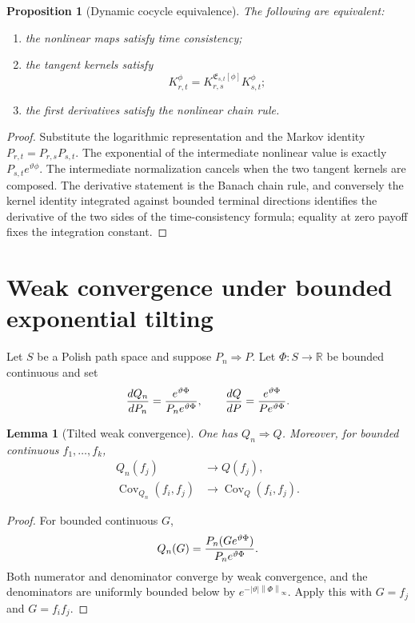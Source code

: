 \documentclass[11pt,reqno]{amsart}
\newtheorem{lemma}[theorem]{Lemma}
\newtheorem{proposition}[theorem]{Proposition}
\theoremstyle{definition}
\newcommand{\R}{\mathbb R}
\newcommand{\norm}[1]{\left\lVert#1\right\rVert}
\newcommand{\abs}[1]{\left\lvert#1\right\rvert}
\begin{document}
\begin{proposition}[Dynamic cocycle equivalence]\label{prop:cocycle-equivalence}
The following are equivalent:
\begin{enumerate}
\item the nonlinear maps satisfy time consistency;
\item the tangent kernels satisfy
\[
 K_{r,t}^{\phi}
 =K_{r,s}^{\mathfrak E_{s,t}[\phi]}K_{s,t}^{\phi};
\]
\item the first derivatives satisfy the nonlinear chain rule.
\end{enumerate}
\end{proposition}

\begin{proof}
Substitute the logarithmic representation and the Markov identity
$P_{r,t}=P_{r,s}P_{s,t}$.  The exponential of the intermediate nonlinear value
is exactly $P_{s,t}e^{\vartheta\phi}$.  The intermediate normalization cancels
when the two tangent kernels are composed.  The derivative statement is the
Banach chain rule, and conversely the kernel identity integrated against
bounded terminal directions identifies the derivative of the two sides of the
time-consistency formula; equality at zero payoff fixes the integration
constant.
\end{proof}

\section{Weak convergence under bounded exponential tilting}

Let $S$ be a Polish path space and suppose $P_n\Rightarrow P$.  Let
$\Phi:S\to\R$ be bounded continuous and set
\[
 {dQ_n\over dP_n}={e^{\vartheta\Phi}\over P_ne^{\vartheta\Phi}},
 \qquad
 {dQ\over dP}={e^{\vartheta\Phi}\over Pe^{\vartheta\Phi}}.
\]

\begin{lemma}[Tilted weak convergence]\label{lem:tilted-convergence}
One has $Q_n\Rightarrow Q$.  Moreover, for bounded continuous
$f_1,\ldots,f_k$,
\begin{align*}
 Q_n(f_j)&\to Q(f_j),\\
 \operatorname{Cov}_{Q_n}(f_i,f_j)&\to
 \operatorname{Cov}_Q(f_i,f_j).
\end{align*}
\end{lemma}

\begin{proof}
For bounded continuous $G$,
\[
 Q_n(G)={P_n(Ge^{\vartheta\Phi})\over P_ne^{\vartheta\Phi}}.
\]
Both numerator and denominator converge by weak convergence, and the
denominators are uniformly bounded below by
$e^{-\abs\vartheta\norm\Phi_\infty}$.  Apply this with $G=f_j$ and
$G=f_if_j$.
\end{proof}
\end{document}
